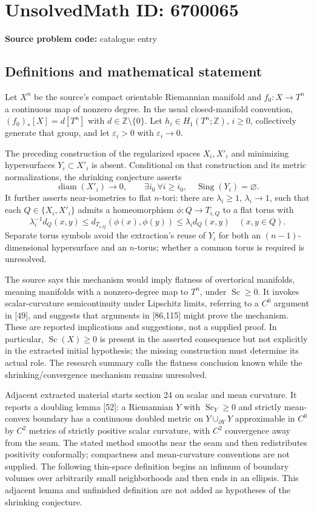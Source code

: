 \documentclass[11pt]{article}
\newcommand{\Z}{\mathbb{Z}}
\begin{document}
\section*{UnsolvedMath ID: 6700065}
\textbf{Source problem code:} catalogue entry
\subsection{Definitions and mathematical statement}
Let \(X^n\) be the source's compact orientable Riemannian manifold and \(f_0:X\to T^n\) a continuous map of nonzero degree. In the usual closed-manifold convention, \((f_0)_*[X]=d[T^n]\) with \(d\in\Z\setminus\{0\}\). Let \(h_i\in H_1(T^n;\Z)\), \(i\ge0\), collectively generate that group, and let \(\varepsilon_i>0\) with \(\varepsilon_i\to0\).

The preceding construction of the regularized spaces \(X_i,X'_i\) and minimizing hypersurfaces \(Y_i\subset X'_i\) is absent. Conditional on that construction and its metric normalizations, the shrinking conjecture asserts
\[
\operatorname{diam}(X'_i)\longrightarrow0,
\qquad
\exists i_0\ \forall i\ge i_0,\quad \operatorname{Sing}(Y_i)=\varnothing.
\]
It further asserts near-isometries to flat \(n\)-tori: there are \(\lambda_i\ge1\), \(\lambda_i\to1\), such that each \(Q\in\{X_i,X'_i\}\) admits a homeomorphism \(\phi:Q\to T_{i,Q}\) to a flat torus with
\[
\lambda_i^{-1}d_Q(x,y)\le d_{T_{i,Q}}(\phi(x),\phi(y))
\le\lambda_i d_Q(x,y)\quad(x,y\in Q).
\]
Separate torus symbols avoid the extraction's reuse of \(Y_i\) for both an \((n-1)\)-dimensional hypersurface and an \(n\)-torus; whether a common torus is required is unresolved.

The source says this mechanism would imply flatness of overtorical manifolds, meaning manifolds with a nonzero-degree map to \(T^n\), under \(\operatorname{Sc}\ge0\). It invokes scalar-curvature semicontinuity under Lipschitz limits, referring to a \(C^0\) argument in [49], and suggests that arguments in [86,115] might prove the mechanism. These are reported implications and suggestions, not a supplied proof. In particular, \(\operatorname{Sc}(X)\ge0\) is present in the asserted consequence but not explicitly in the extracted initial hypothesis; the missing construction must determine its actual role. The research summary calls the flatness conclusion known while the shrinking/convergence mechanism remains unresolved.

Adjacent extracted material starts section 24 on scalar and mean curvature. It reports a doubling lemma [52]: a Riemannian \(Y\) with \(\operatorname{Sc}_Y\ge0\) and strictly mean-convex boundary has a continuous doubled metric on \(Y\cup_{\partial Y}Y\) approximable in \(C^0\) by \(C^2\) metrics of strictly positive scalar curvature, with \(C^2\) convergence away from the seam. The stated method smooths near the seam and then redistributes positivity conformally; compactness and mean-curvature conventions are not supplied. The following thin-space definition begins an infimum of boundary volumes over arbitrarily small neighborhoods and then ends in an ellipsis. This adjacent lemma and unfinished definition are not added as hypotheses of the shrinking conjecture.
\end{document}
